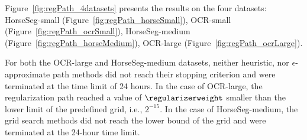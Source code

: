 \documentclass{article}
\begin{document}
Figure~\ref{fig:regPath_4datasets} presents the results on the four datasets: HorseSeg-small (Figure~\ref{fig:regPath_horseSmall}),
OCR-small (Figure~\ref{fig:regPath_ocrSmall}),
HorseSeg-medium (Figure~\ref{fig:regPath_horseMedium}),
OCR-large (Figure~\ref{fig:regPath_ocrLarge}).

For both the OCR-large and HorseSeg-medium datasets, neither heuristic, nor $\epsilon$-approximate path methods did not reach their stopping criterion and were terminated at the time limit of 24 hours.
In the case of OCR-large, the regularization path reached a value of $\regularizerweight$ smaller than the lower limit of the predefined grid, i.e., $2^{-15}$. 
In the case of HorseSeg-medium, the grid search methods did not reach the lower bound of the grid and were terminated at the 24-hour time limit.
\end{document}
